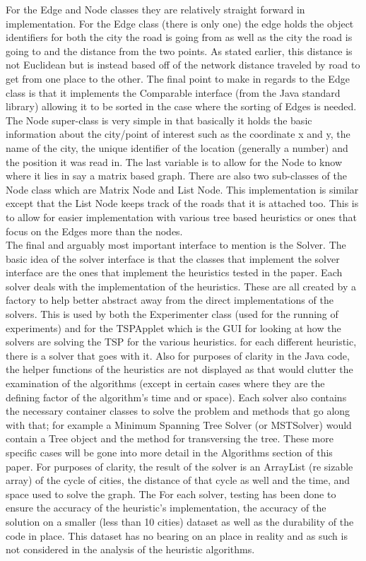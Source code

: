 \documentclass[midd]{thesis}
\newcommand{\tab}{\hspace*{2em}}
\begin{document}
\tab For the Edge and Node classes they are relatively straight forward in implementation. For the Edge class (there is only one) the edge holds the object identifiers for both the city the road is going from as well as the city the road is going to and the distance from the two points. As stated earlier, this distance is not Euclidean but is instead based off of the network distance traveled by road to get from one place to the other. The final point to make in regards to the Edge class is that it implements the Comparable interface (from the Java standard library) allowing it to be sorted in the case where the sorting of Edges is needed. The Node super-class is very simple in that basically it holds the basic information about the city/point of interest such as the coordinate x and y, the name of the city, the unique identifier of the location (generally a number) and the position it was read in. The last variable is to allow for the Node to know where it lies in say a matrix based graph. There are also two sub-classes of the Node class which are Matrix Node and List Node. This implementation is similar except that the List Node keeps track of the roads that it is attached too. This is to allow for easier implementation with various tree based heuristics or ones that focus on the Edges more than the nodes.\\  
\tab The final and arguably most important interface to mention is the Solver. The basic idea of the solver interface is that the classes that implement the solver interface are the ones that implement the heuristics tested in the paper. Each solver deals with the implementation of the heuristics. These are all created by a factory to help better abstract away from the direct implementations of the solvers. This is used by both the Experimenter class (used for the running of experiments) and for the TSPApplet which is the GUI for looking at how the solvers are solving the TSP for the various heuristics. for each different heuristic, there is a solver that goes with it. Also for purposes of clarity in the Java code, the helper functions of the heuristics are not displayed as that would clutter the examination of the algorithms (except in certain cases where they are the defining factor of the algorithm's time and or space). Each solver also contains the necessary container classes to solve the problem and methods that go along with that; for example a Minimum Spanning Tree Solver (or MSTSolver) would contain a Tree object and the method for transversing the tree. These more specific cases will be gone into more detail in the Algorithms section of this paper. For purposes of clarity, the result of the solver is an ArrayList (re sizable array) of the cycle of cities, the distance of that cycle as well and the time, and space used to solve the graph. The For each solver, testing has been done to ensure the accuracy of the heuristic's implementation, the accuracy of the solution on a smaller (less than 10 cities) dataset as well as the durability of the code in place. This dataset has no bearing on an place in reality and as such is not considered in the analysis of the heuristic algorithms.\\
\end{document}
